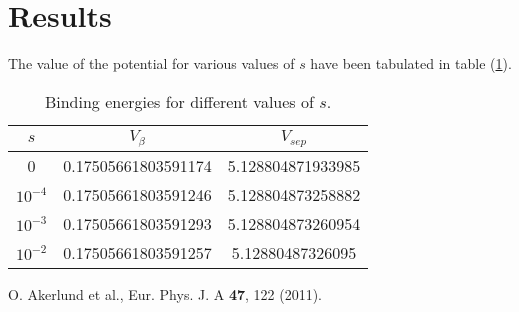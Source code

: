 \documentclass[aps,prc,preprint,groupedaddress]{revtex4-1}
\begin{document}
\section{Results}
The value of the potential for various values of $s$ have been tabulated in table (\ref{tab1}).
 \begin{center}
\begin{table}
\caption{Binding energies for different values of $s$.}
\begin{ruledtabular} \label{tab1}
\begin{tabular}{|ccc|}
\hline
$s$ & $V_\beta$ & $V_{sep}$ \\
\hline
   0         & 0.17505661803591174 & 5.128804871933985   \\
   $10^{-4}$ & 0.17505661803591246 & 5.128804873258882\\
   $10^{-3}$ & 0.17505661803591293 & 5.128804873260954      \\
   $10^{-2}$ & 0.17505661803591257 & 5.12880487326095      \\
\hline
\end{tabular}
\end{ruledtabular}
\end{table}
\end{center}







%
%


\begin{thebibliography}{9}

O. Akerlund et al., Eur. Phys. J. A {\bf 47}, 122 (2011).



\end{thebibliography}

 
\end{document}
